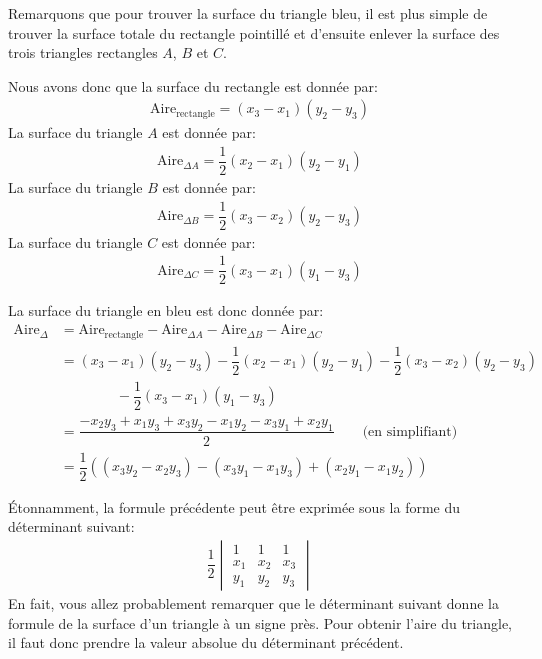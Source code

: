 \documentclass[]{book}
\theoremstyle{definition}
\theoremstyle{definition}
\theoremstyle{definition}
\theoremstyle{remark}
\begin{document}
Remarquons que pour trouver la surface du triangle bleu, il est plus simple de trouver la surface totale du rectangle pointillé et d'ensuite enlever la surface des trois triangles rectangles \(A\), \(B\) et \(C\).

Nous avons donc que la surface du rectangle est donnée par:
\begin{align*}
\text{Aire}_{\text{rectangle}} = (x_3-x_1)(y_2-y_3)
\end{align*}
La surface du triangle \(A\) est donnée par:
\begin{align*}
\text{Aire}_{\Delta A} = \dfrac{1}{2}(x_2-x_1)(y_2-y_1)
\end{align*}
La surface du triangle \(B\) est donnée par:
\begin{align*}
\text{Aire}_{\Delta B} = \dfrac{1}{2}(x_3-x_2)(y_2-y_3)
\end{align*}
La surface du triangle \(C\) est donnée par:
\begin{align*}
\text{Aire}_{\Delta C} = \dfrac{1}{2}(x_3-x_1)(y_1-y_3)
\end{align*}

La surface du triangle en bleu est donc donnée par:
\begin{align*}
\text{Aire}_{\Delta} &= \text{Aire}_{\text{rectangle}}-\text{Aire}_{\Delta A}-\text{Aire}_{\Delta B}-\text{Aire}_{\Delta C} \\
&= (x_3-x_1)(y_2-y_3)-\dfrac{1}{2}(x_2-x_1)(y_2-y_1)-\dfrac{1}{2}(x_3-x_2)(y_2-y_3) \\
& \qquad \qquad -\dfrac{1}{2}(x_3-x_1)(y_1-y_3) \\
&= \dfrac{-x_2y_3+x_1y_3+x_3y_2-x_1y_2-x_3y_1+x_2y_1}{2} \qquad\text{(en simplifiant)} \\
&= \dfrac{1}{2}\left((x_3y_2-x_2y_3)-(x_3y_1-x_1y_3)+(x_2y_1-x_1y_2)\right)
\end{align*}

Étonnamment, la formule précédente peut être exprimée sous la forme du déterminant suivant:
\begin{align*}
\dfrac{1}{2}\begin{vmatrix}
1 & 1 & 1 \\
x_1 & x_2 & x_3 \\
y_1 & y_2 & y_3
\end{vmatrix}
\end{align*}
En fait, vous allez probablement remarquer que le déterminant suivant donne la formule de la surface d'un triangle à un signe près. Pour obtenir l'aire du triangle, il faut donc prendre la valeur absolue du déterminant précédent.
\end{document}
